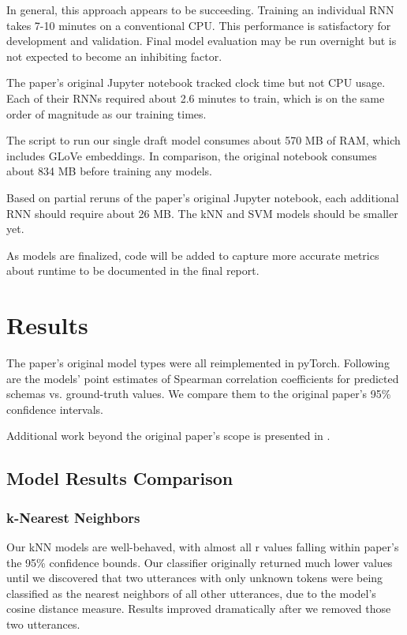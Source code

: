 \documentclass[11pt,a4paper]{article}
\begin{document}
In general, this approach appears to be succeeding. Training an individual RNN takes 7-10 minutes on a conventional CPU. This performance is satisfactory for development and validation. Final model evaluation may be run overnight but is not expected to become an inhibiting factor. 

The paper's original Jupyter notebook tracked clock time but not CPU usage. Each of their RNNs required about 2.6 minutes to train, which is on the same order of magnitude as our training times.

The script to run our single draft model consumes about 570 MB of RAM, which includes GLoVe embeddings. In comparison, the original notebook consumes about 834 MB before training any models.

Based on partial reruns of the paper's original Jupyter notebook, each additional RNN should require about 26 MB. The kNN and SVM models should be smaller yet.

As models are finalized, code will be added to capture more accurate metrics about runtime to be documented in the final report. 

\section{Results}
The paper's original model types were all reimplemented in pyTorch. Following are the models' point estimates of Spearman correlation coefficients for predicted schemas vs. ground-truth values. We compare them to the original paper's 95\% confidence intervals.

Additional work beyond the original paper's scope is presented in .

\subsection{Model Results Comparison}
\subsubsection{k-Nearest Neighbors}

Our kNN models are well-behaved, with almost all r values falling within paper's the 95\% confidence bounds. Our classifier originally returned much lower values until we discovered that two utterances with only unknown tokens were being classified as the nearest neighbors of all other utterances, due to the model's cosine distance measure. Results improved dramatically after we removed those two utterances.
\end{document}
